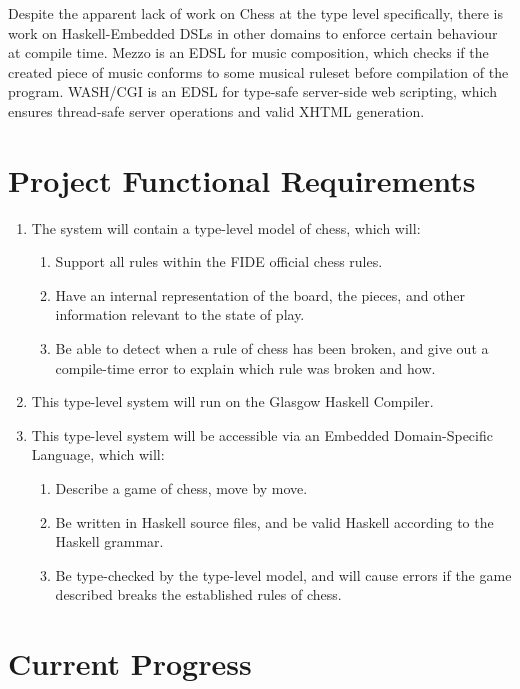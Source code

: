 \documentclass[12pt, a4paper]{scrartcl}
\begin{document}
Despite the apparent lack of work on Chess at the type level specifically, there is work on Haskell-Embedded DSLs in other domains to enforce certain behaviour at compile time. Mezzo\cite{mezzohaskellsymposium} is an EDSL for music composition, which checks if the created piece of music conforms to some musical ruleset before compilation of the program. WASH/CGI\cite{washcgi} is an EDSL for type-safe server-side web scripting, which ensures thread-safe server operations and valid XHTML generation.

\section{Project Functional Requirements}

\begin{enumerate}
    \item The system will contain a type-level model of chess, which will:
          \begin{enumerate}
              \item Support all rules within the FIDE official chess rules.
              \item Have an internal representation of the board, the pieces, and other information relevant to the state of play.
              \item Be able to detect when a rule of chess has been broken, and give out a compile-time error to explain which rule was broken and how.
          \end{enumerate}
    \item This type-level system will run on the Glasgow Haskell Compiler.
    \item This type-level system will be accessible via an Embedded Domain-Specific Language, which will:
          \begin{enumerate}
              \item Describe a game of chess, move by move.
              \item Be written in Haskell source files, and be valid Haskell according to the Haskell grammar.
              \item Be type-checked by the type-level model, and will cause errors if the game described breaks the established rules of chess.
          \end{enumerate}
\end{enumerate}

\section{Current Progress}
\end{document}
